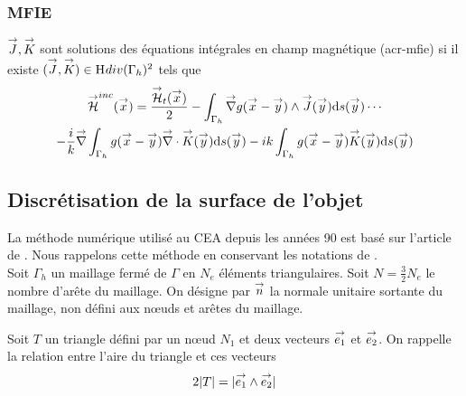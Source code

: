       \subsubsection{MFIE}

        \begin{defn}
          \({\overset{\rightarrow}{J}},{\overset{\rightarrow}{K}}\) sont solutions des équations intégrales en champ magnétique (\gls{acr-mfie}) si il existe \(({\overset{\rightarrow}{J}},{\overset{\rightarrow}{K}}) \in \mathrm{H}_\mathrm{{}}{div}(\Gamma_h)^2\) tels que
          \begin{multline}
            \label{eq:form_int:MFIE}
            \vH^{inc}(\vx) =
            \frac{\vH_t(\vx)}{2}
              - \int_{\Gamma_h} \vgrad g(\vx - \vy) \pvect \vJ(\vy) \dd{s}(\vy) \cdots \\
            - \frac{i}{k} \vgrad \int_{\Gamma_h}  g(\vx - \vy)\vdiv\vK(\vy)\dd{s}(\vy)
              - ik \int_{\Gamma_h} g(\vx - \vy)\vK(\vy)\dd{s}(\vy)
          \end{multline}
        \end{defn}

  \subsection{Discrétisation de la surface de l'objet}

    La méthode numérique utilisé au CEA depuis les années 90 est basé sur l'article de \cite{medgyesi-mitschang_integral_1985}. Nous rappelons cette méthode en conservant les notations de \cite{stupfel_implementation_2015}.\\

    Soit \(\Gamma_h\) un maillage fermé de \(\Gamma\) en \(N_e\) éléments triangulaires. Soit \(N=\frac{3}{2}N_e\) le nombre d'arête du maillage. On désigne par \({\overset{\rightarrow}{n}}\) la normale unitaire sortante du maillage, non défini aux nœuds et arêtes du maillage.

    Soit \(T\) un triangle défini par un nœud \(N_1\) et deux vecteurs \({\overset{\rightarrow}{e_1}}\) et \({\overset{\rightarrow}{e_2}}\). On rappelle la relation entre l'aire du triangle et ces vecteurs
    \begin{equation}
      2|T| = |{\overset{\rightarrow}{e_1}}\wedge{\overset{\rightarrow}{e_2}}|
    \end{equation}


